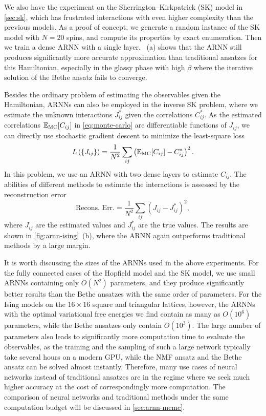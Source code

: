 We also have the experiment on the Sherrington--Kirkpatrick (SK) model in \cref{sec:sk}, which has frustrated interactions with even higher complexity than the previous models. As a proof of concept, we generate a random instance of the SK model with $N = 20$ spins, and compute its properties by exact enumeration. Then we train a dense ARNN with a single layer. ~(a) shows that the ARNN still produces significantly more accurate approximation than traditional ansatzes for this Hamiltonian, especially in the glassy phase with high $\beta$ where the iterative solution of the Bethe ansatz fails to converge.

Besides the ordinary problem of estimating the observables given the Hamiltonian, ARNNs can also be employed in the inverse SK problem, where we estimate the unknown interactions $J^*_{i j}$ given the correlations $C^*_{i j}$. As the estimated correlations $\mathbb{E}_\text{MC}[C_{i j}]$ in \cref{eq:monte-carlo} are differentiable functions of $J_{i j}$, we can directly use stochastic gradient descent to minimize the least-square loss
\begin{equation}
L\left( \{J_{i j}\} \right) = \frac{1}{N^2} \sum_{i j} \left( \mathbb{E}_\text{MC}[C_{i j}] - C^*_{i j} \right)^2.
\end{equation}
In this problem, we use an ARNN with two dense layers to estimate $C_{i j}$. The abilities of different methods to estimate the interactions is assessed by the reconstruction error
\begin{equation}
\text{Recons. Err.} = \frac{1}{N^2} \sum_{i j} \left( J_{i j} - J^*_{i j} \right)^2,
\end{equation}
where $J_{i j}$ are the estimated values and $J^*_{i j}$ are the true values. The results are shown in \cref{fig:arnn-ising}~(b), where the ARNN again outperforms traditional methods by a large margin.

It is worth discussing the sizes of the ARNNs used in the above experiments. For the fully connected cases of the Hopfield model and the SK model, we use small ARNNs containing only $O(N^2)$ parameters, and they produce significantly better results than the Bethe ansatzes with the same order of parameters. For the Ising models on the $16 \times 16$ square and triangular lattices, however, the ARNNs with the optimal variational free energies we find contain as many as $O(10^6)$ parameters, while the Bethe ansatzes only contain $O(10^3)$. The large number of parameters also leads to significantly more computation time to evaluate the observables, as the training and the sampling of such a large network typically take several hours on a modern GPU, while the NMF ansatz and the Bethe ansatz can be solved almost instantly. Therefore, many use cases of neural networks instead of traditional ansatzes are in the regime where we seek much higher accuracy at the cost of correspondingly more computation. The comparison of neural networks and traditional methods under the same computation budget will be discussed in \cref{sec:arnn-mcmc}.

